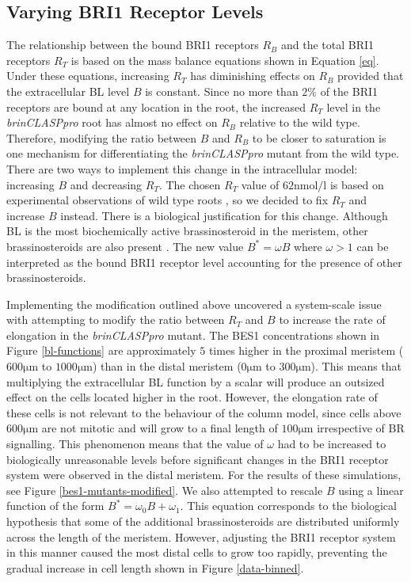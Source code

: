 \documentclass[referee,pdflatex,sn-mathphys-num]{sn-jnl}
\newcommand{\um}{\unit{\micro\metre}}
\newcommand{\nm}{\unit{\nano\mole\per\litre}}
\begin{document}
\subsection{Varying BRI1 Receptor Levels}

The relationship between the bound BRI1 receptors $R_{B}$ and the total BRI1 receptors $R_{T}$ is based on the mass balance equations shown in Equation \eqref{eq}.
Under these equations, increasing $R_{T}$ has diminishing effects on $R_{B}$ provided that the extracellular BL level $B$ is constant.
Since no more than $2\%$ of the BRI1 receptors are bound at any location in the root, the increased $R_{T}$ level in the \emph{brinCLASPpro} root has almost no effect on $R_{B}$ relative to the wild type.
Therefore, modifying the ratio between $B$ and $R_{B}$ to be closer to saturation is one mechanism for differentiating the \emph{brinCLASPpro} mutant from the wild type.
There are two ways to implement this change in the intracellular model: increasing $B$ and decreasing $R_{T}$.
The chosen $R_{T}$ value of $62\nm$ is based on experimental observations of wild type roots \cite{vanesse2011}, so we decided to fix $R_{T}$ and increase $B$ instead.
There is a biological justification for this change.
Although BL is the most biochemically active brassinosteroid in the meristem, other brassinosteroids are also present \cite{vukasinovic2021, ackerman-lavert2020}.
The new value $B^{*} = \omega B$ where $\omega > 1$ can be interpreted as the bound BRI1 receptor level accounting for the presence of other brassinosteroids. 

Implementing the modification outlined above uncovered a system-scale issue with attempting to modify the ratio between $R_{T}$ and $B$ to increase the rate of elongation in the \emph{brinCLASPpro} mutant.
The BES1 concentrations shown in Figure \ref{bl-functions} are approximately $5$ times higher in the proximal meristem ($600\um$ to $1000\um$) than in the distal meristem ($0\um$ to $300\um$).
This means that multiplying the extracellular BL function by a scalar will produce an outsized effect on the cells located higher in the root.
However, the elongation rate of these cells is not relevant to the behaviour of the column model, since cells above $600\um$ are not mitotic and will grow to a final length of $100\um$ irrespective of BR signalling.
This phenomenon means that the value of $\omega$ had to be increased to biologically unreasonable levels before significant changes in the BRI1 receptor system were observed in the distal meristem.
For the results of these simulations, see Figure \ref{bes1-mutants-modified}.
We also attempted to rescale $B$ using a linear function of the form $B^{*} = \omega_{0}B + \omega_{1}$.
This equation corresponds to the biological hypothesis that some of the additional brassinosteroids are distributed uniformly across the length of the meristem.
However, adjusting the BRI1 receptor system in this manner caused the most distal cells to grow too rapidly, preventing the gradual increase in cell length shown in Figure \ref{data-binned}.
 
\end{document}
